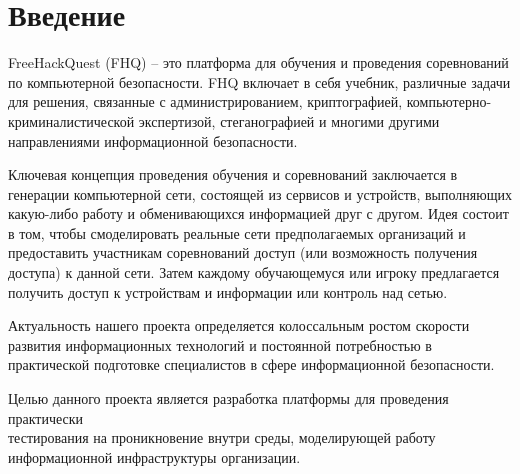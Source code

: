 \section*{Введение}

FreeHackQuest (FHQ) -- это платформа для обучения и проведения соревнований по компьютерной безопасности. FHQ включает в себя учебник, различные задачи для решения, связанные с администрированием, криптографией, компьютерно-криминалистической экспертизой, стеганографией и многими другими направлениями информационной безопасности.\par
Ключевая концепция проведения обучения и соревнований заключается в генерации компьютерной сети, состоящей из сервисов и устройств, выполняющих какую-либо работу и обменивающихся информацией друг с другом. Идея состоит в том, чтобы смоделировать реальные сети предполагаемых организаций и предоставить участникам соревнований доступ (или возможность получения доступа) к данной сети. Затем каждому обучающемуся или игроку предлагается получить доступ к устройствам и информации или контроль над сетью.\par
Актуальность нашего проекта определяется колоссальным ростом скорости развития информационных технологий и постоянной потребностью в практической подготовке специалистов в сфере информационной безопасности.\par
Целью данного проекта является разработка платформы для проведения практически\\тестирования на проникновение внутри среды, моделирующей работу информационной инфраструктуры организации.\par
\clearpage